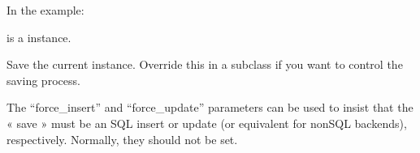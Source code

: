 \documentclass[letterpaper,10pt,french]{sphinxmanual}
\begin{document}
\begin{fulllineitems}
\begin{fulllineitems}
\sphinxAtStartPar
In the example:

\begin{sphinxVerbatim}[commandchars=\\\{\}]
 
       
\end{sphinxVerbatim}

\sphinxAtStartPar
{} is a  instance.

\end{fulllineitems}


\begin{fulllineitems}
\label{\detokenize{main/model:main.models.DirecteurDesEtudes.personnel_ptr_id}}
\pysigstartsignatures
{}
\pysigstopsignatures
\end{fulllineitems}


\begin{fulllineitems}
\label{\detokenize{main/model:main.models.DirecteurDesEtudes.save}}
\pysigstartsignatures
{}
\pysigstopsignatures
\sphinxAtStartPar
Save the current instance. Override this in a subclass if you want to
control the saving process.

\sphinxAtStartPar
The “force\_insert” and “force\_update” parameters can be used to insist
that the « save » must be an SQL insert or update (or equivalent for
non\sphinxhyphen{}SQL backends), respectively. Normally, they should not be set.

\end{fulllineitems}


\end{fulllineitems}

\end{document}
